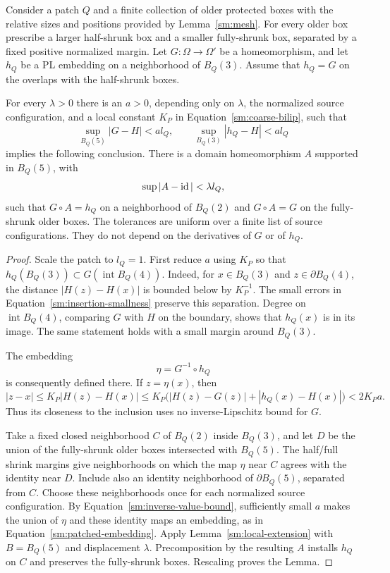 \begin{lemma}
\label{sm:insertion}
Consider a patch $Q$ and a finite collection of older protected
boxes with the relative sizes and positions provided by
Lemma~\ref{sm:mesh}.  For every older box prescribe a larger
half-shrunk box and a smaller fully-shrunk box, separated by a
fixed positive normalized margin.  Let $G:\Omega\to\Omega'$ be
a homeomorphism, and let $h_Q$ be a PL embedding on a neighborhood
of $B_Q(3)$.  Assume that $h_Q=G$ on the overlaps with the
half-shrunk boxes.

For every $\lambda>0$ there is an $a>0$, depending only on
$\lambda$, the normalized source configuration, and a local
constant $K_P$ in Equation~\eqref{sm:coarse-bilip}, such that
\begin{equation}
 \label{sm:insertion-smallness}
 \sup_{B_Q(5)}|G-H|<a l_Q,
 \qquad \sup_{B_Q(3)}|h_Q-H|<a l_Q
\end{equation}
implies the following conclusion.  There is a domain
homeomorphism $A$ supported in $B_Q(5)$, with
\[
 \sup|A-\operatorname{id}|<\lambda l_Q,
\]
such that $G\circ A=h_Q$ on a neighborhood of $B_Q(2)$ and
$G\circ A=G$ on the fully-shrunk older boxes.  The tolerances
are uniform over a finite list of source configurations.  They
do not depend on the derivatives of $G$ or of $h_Q$.
\end{lemma}

\begin{proof}
Scale the patch to $l_Q=1$.  First reduce $a$ using $K_P$ so
that $h_Q(B_Q(3))\subset G(\operatorname{int}B_Q(4))$.
Indeed, for $x\in B_Q(3)$ and $z\in\partial B_Q(4)$,
the distance $|H(z)-H(x)|$ is bounded below by $K_P^{-1}$.
The small errors in Equation~\eqref{sm:insertion-smallness} preserve
this separation.  Degree on $\operatorname{int}B_Q(4)$,
comparing $G$ with $H$ on the boundary, shows that $h_Q(x)$
is in its image.  The same statement holds with a small
margin around $B_Q(3)$.

The embedding
\[
 \eta=G^{-1}\circ h_Q
\]
is consequently defined there.  If $z=\eta(x)$, then
\begin{equation}
 \label{sm:inverse-value-bound}
 |z-x|\le K_P|H(z)-H(x)|
 \le K_P\bigl(|H(z)-G(z)|+|h_Q(x)-H(x)|\bigr)
 <2K_Pa.
\end{equation}
Thus its closeness to the inclusion uses no inverse-Lipschitz
bound for $G$.

Take a fixed closed neighborhood $C$ of $B_Q(2)$ inside
$B_Q(3)$, and let $D$ be the union of the fully-shrunk older
boxes intersected with $B_Q(5)$.  The half/full shrink margins
give neighborhoods on which the map $\eta$ near $C$ agrees
with the identity near $D$.  Include also an identity
neighborhood of $\partial B_Q(5)$, separated from $C$.
Choose these neighborhoods once for each normalized source
configuration.  By Equation~\eqref{sm:inverse-value-bound}, sufficiently
small $a$ makes the union of $\eta$ and these identity maps
an embedding, as in Equation~\eqref{sm:patched-embedding}.  Apply
Lemma~\ref{sm:local-extension} with $B=B_Q(5)$ and displacement
$\lambda$.  Precomposition by the resulting $A$ installs
$h_Q$ on $C$ and preserves the fully-shrunk boxes.  Rescaling
proves the Lemma.
\end{proof}

